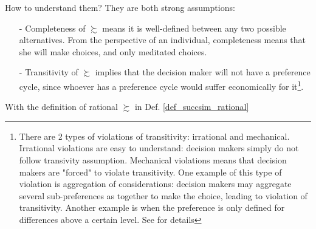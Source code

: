 How to understand them? They are both strong assumptions:
\begin{enumerate}
    \item[-] Completeness of $\succsim$ means it is well-defined between any two possible alternatives. From the perspective of an individual, completeness means that she will make choices, and only meditated choices.
    \item[-] Transitivity of $\succsim$ implies that the decision maker will not have a preference cycle, since whoever has a preference cycle would suffer economically for it\footnote{There are 2 types of violations of 
    transitivity: irrational and mechanical. Irrational violations are easy to understand: decision makers simply do not follow transivity assumption. Mechanical violations means that decision makers are "forced" to violate transitivity. One 
    example of this type of violation is aggregation of considerations: decision makers may aggregate several sub-preferences as together to make the choice, leading to violation of transitivity. Another example is when the preference
    is only defined for differences above a certain level. See \citet[Page 4-5]{ariel2012lecture} for details}.   
\end{enumerate}

With the definition of rational $\succsim$ in Def. \ref{def_succsim_rational}
